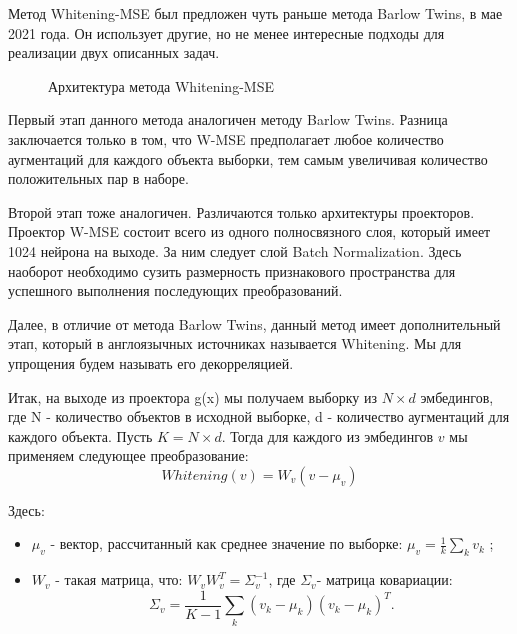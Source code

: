Метод Whitening-MSE был предложен чуть раньше метода Barlow Twins, в мае 2021 года. Он использует другие, но не менее интересные подходы для реализации двух описанных задач.

\begin{figure}[H]
        \caption{Архитектура метода Whitening-MSE}
        \label{W_MSE_arch}
\end{figure} 

Первый этап данного метода аналогичен методу Barlow Twins. Разница заключается только в том, что W-MSE предполагает любое количество аугментаций для каждого объекта выборки, тем самым увеличивая количество положительных пар в наборе.

Второй этап тоже аналогичен. Различаются только архитектуры проекторов. Проектор W-MSE состоит всего из одного полносвязного слоя, который имеет 1024 нейрона на выходе. За ним следует слой Batch Normalization. Здесь наоборот необходимо сузить размерность признакового пространства для успешного выполнения последующих преобразований.

Далее, в отличие от метода Barlow Twins, данный метод имеет дополнительный этап, который в англоязычных источниках называется Whitening. Мы для упрощения будем называть его декорреляцией. 

Итак, на выходе из проектора g(x) мы получаем выборку из $N\times d$ эмбедингов, где N - количество объектов в исходной выборке, d - количество аугментаций для каждого объекта. Пусть $K=N\times d$. Тогда для каждого из эмбедингов $v$ мы применяем следующее преобразование:
$$
Whitening(v)=W_v(v-\mu_v)
$$

Здесь:
\begin{itemize}
    \item $\mu_v$ - вектор, рассчитанный как среднее значение по выборке: $\mu_v=\frac{1}{k}\sum_kv_k$ ;
    \item $W_v$ - такая матрица, что: $W_vW_v^T=\Sigma_v^{-1}$, где $\Sigma_v$- матрица ковариации:
    $$
    \Sigma_v=\frac{1}{K-1}\sum_k(v_k-\mu_k)(v_k-\mu_k)^T.
    $$
\end{itemize} 

